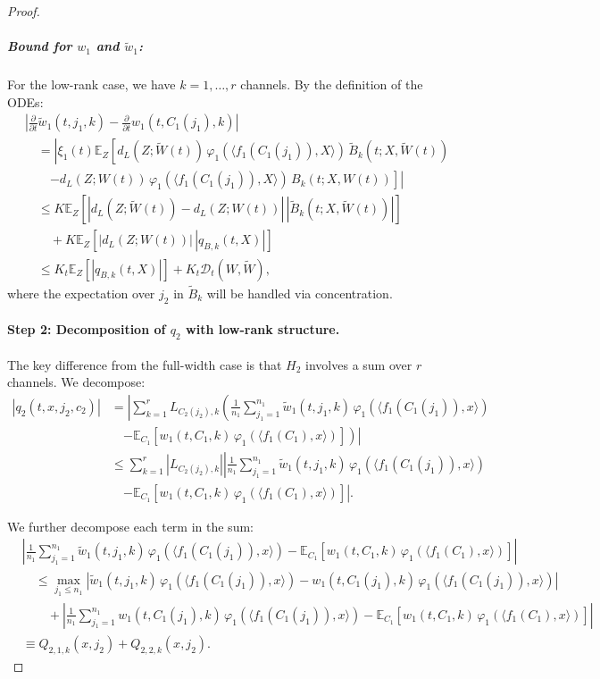 \begin{proof}
\subparagraph*{Bound for $w_1$ and $\tilde{w}_1$:}
For the low-rank case, we have $k = 1, \ldots, r$ channels. By the definition of the ODEs:
\begin{align*}
&\left|\frac{\partial}{\partial t}\tilde{w}_1(t, j_1, k) - \frac{\partial}{\partial t}w_1(t, C_1(j_1), k)\right|\\
&\quad = \left|\xi_1(t)\mathbb{E}_Z\left[d_L(Z; \tilde{W}(t))\,\varphi_1(\langle f_1(C_1(j_1)), X\rangle)\,\tilde{B}_k(t; X, \tilde{W}(t))\right.\right.\\
&\quad\quad\left.\left. - d_L(Z; W(t))\,\varphi_1(\langle f_1(C_1(j_1)), X\rangle)\,B_k(t; X, W(t))\right]\right|\\
&\quad \le K\mathbb{E}_Z\left[|d_L(Z; \tilde{W}(t)) - d_L(Z; W(t))|\,|\tilde{B}_k(t; X, \tilde{W}(t))|\right]\\
&\quad\quad + K\mathbb{E}_Z\left[|d_L(Z; W(t))|\,|q_{B,k}(t, X)|\right]\\
&\quad \le K_t\mathbb{E}_Z\left[|q_{B,k}(t, X)|\right] + K_t\mathscr{D}_t(W, \tilde{W}),
\end{align*}
where the expectation over $j_2$ in $\tilde{B}_k$ will be handled via concentration.

\paragraph*{Step 2: Decomposition of $q_2$ with low-rank structure.}

The key difference from the full-width case is that $H_2$ involves a sum over $r$ channels. We decompose:
\begin{align*}
|q_2(t, x, j_2, c_2)| &= \left|\sum_{k=1}^r L_{C_2(j_2),k}\left(\frac{1}{n_1}\sum_{j_1=1}^{n_1}\tilde{w}_1(t, j_1, k)\,\varphi_1(\langle f_1(C_1(j_1)), x\rangle)\right.\right.\\
&\quad\left.\left. - \mathbb{E}_{C_1}[w_1(t, C_1, k)\,\varphi_1(\langle f_1(C_1), x\rangle)]\right)\right|\\
&\le \sum_{k=1}^r |L_{C_2(j_2),k}|\left|\frac{1}{n_1}\sum_{j_1=1}^{n_1}\tilde{w}_1(t, j_1, k)\,\varphi_1(\langle f_1(C_1(j_1)), x\rangle)\right.\\
&\quad\left. - \mathbb{E}_{C_1}[w_1(t, C_1, k)\,\varphi_1(\langle f_1(C_1), x\rangle)]\right|.
\end{align*}

We further decompose each term in the sum:
\begin{align*}
&\left|\frac{1}{n_1}\sum_{j_1=1}^{n_1}\tilde{w}_1(t, j_1, k)\,\varphi_1(\langle f_1(C_1(j_1)), x\rangle) - \mathbb{E}_{C_1}[w_1(t, C_1, k)\,\varphi_1(\langle f_1(C_1), x\rangle)]\right|\\
&\quad \le \max_{j_1 \le n_1}\left|\tilde{w}_1(t, j_1, k)\,\varphi_1(\langle f_1(C_1(j_1)), x\rangle) - w_1(t, C_1(j_1), k)\,\varphi_1(\langle f_1(C_1(j_1)), x\rangle)\right|\\
&\quad\quad + \left|\frac{1}{n_1}\sum_{j_1=1}^{n_1}w_1(t, C_1(j_1), k)\,\varphi_1(\langle f_1(C_1(j_1)), x\rangle) - \mathbb{E}_{C_1}[w_1(t, C_1, k)\,\varphi_1(\langle f_1(C_1), x\rangle)]\right|\\
&\equiv Q_{2,1,k}(x, j_2) + Q_{2,2,k}(x, j_2).
\end{align*}


\end{proof}
